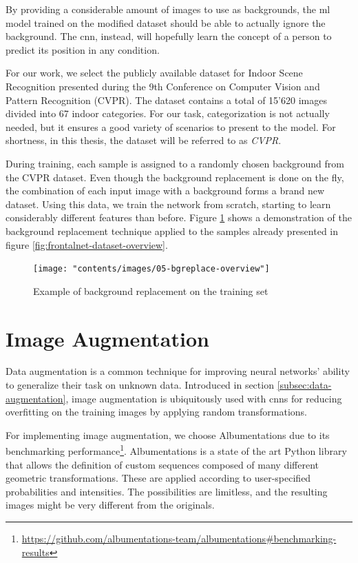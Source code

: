 By providing a considerable amount of images to use as backgrounds, the \gls{ml} model trained on the modified dataset should be able to actually ignore the background. The \gls{cnn}, instead, will hopefully learn the concept of a person to predict its position in any condition.

\medskip

For our work, we select the publicly available dataset \cite{cvpr09} for Indoor Scene Recognition presented during the 9th Conference on Computer Vision and Pattern Recognition (CVPR). The dataset contains a total of 15'620 images divided into 67 indoor categories. For our task, categorization is not actually needed, but it ensures a good variety of scenarios to present to the model. For shortness, in this thesis, the dataset will be referred to as \textit{CVPR}.

During training, each sample is assigned to a randomly chosen background from the CVPR dataset. Even though the background replacement is done on the fly, the combination of each input image with a background forms a brand new dataset. Using this data, we train the network from scratch, starting to learn considerably different features than before. Figure \ref{fig:bgreplace-example} shows a demonstration of the background replacement technique applied to the samples already presented in figure \ref{fig:frontalnet-dataset-overview}. 

\vspace*{5ex}
\begin{figure}[!h]
	\centering
	\texttt{[image: "contents/images/05-bgreplace-overview"]}
	\caption[Example of background replacement on the training set]{Example of background replacement on the training set}
	\label{fig:bgreplace-example}
\end{figure}
\clearpage




\section{Image Augmentation}
\label{sec:implementation-imgaug}

Data augmentation is a common technique for improving neural networks' ability to generalize their task on unknown data. Introduced in section \ref{subsec:data-augmentation}, image augmentation is ubiquitously used with \gls{cnn}s for reducing overfitting on the training images by applying random transformations.

For implementing image augmentation, we choose Albumentations \cite{Buslaev_2020} due to its benchmarking performance\footnote{\url{https://github.com/albumentations-team/albumentations\#benchmarking-results}}. Albumentations is a state of the art Python library that allows the definition of custom sequences composed of many different geometric transformations. These are applied according to user-specified probabilities and intensities. The possibilities are limitless, and the resulting images might be very different from the originals.

